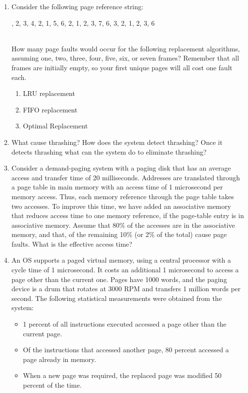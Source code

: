 \documentclass{article}
\begin{document}
\begin{enumerate}
		\item Consider the following page reference string:
		\begin{figure*}[h]
			, 2, 3, 4, 2, 1, 5, 6, 2, 1, 2, 3, 7, 6, 3, 2, 1, 2, 3, 6
		\end{figure*}\\
		How many page faults would occur for the following replacement algorithms, assuming one, two, three, four, five, six, or seven frames? Remember that all frames are initially empty, so your first unique pages will all cost one fault each.
		\begin{enumerate}
			\item LRU replacement
			\item FIFO replacement
			\item Optimal Replacement
		\end{enumerate}
		\item What cause thrashing? How does the system detect thrashing? Once it detects thrashing what can the system do to eliminate thrashing?
		\item Consider a demand-paging system with a paging disk that has an average access and transfer time of 20 milliseconds. Addresses are translated through a page table in main memory with an access time of 1 microsecond per memory access. Thus, each memory reference through the page table takes two accesses. To improve this time, we have added an associative memory that reduces access time to one memory reference, if the page-table entry is in associative memory. Assume that 80\% of the accesses are in the associative memory, and that, of the remaining 10\% (or 2\% of the total) cause page faults. What is the effective access time?
		\item An OS supports a paged virtual memory, using a central processor with a cycle time of 1 microsecond. It costs an additional 1 microsecond to access a page other than the current one. Pages have 1000 words, and the paging device is a drum that rotates at 3000 RPM and transfers 1 million words per second. The following statistical measurements were obtained from the system:
		\begin{itemize}
			\item 1 percent of all instructions executed accessed a page other than the current page.
			\item Of the instructions that accessed another page, 80 percent accessed a page already in memory.
			\item When a new page was required, the replaced page was modified 50 percent of the time.

\end{itemize}
\end{enumerate}
\end{document}
